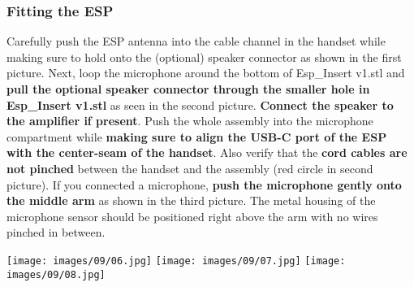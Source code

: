 \documentclass[]{article}
\begin{document}
\subsubsection{Fitting the ESP}
\begin{minipage}[t]{0.4\linewidth}
	\vspace{0pt}
	Carefully push the ESP antenna into the cable channel in the handset while making sure to hold onto the (optional) speaker connector as shown in the first picture.
	\newline
	\newline
	Next, loop the microphone around the bottom of Esp\_Insert v1.stl and \textbf{pull the optional speaker connector through the smaller hole in Esp\_Insert v1.stl} as seen in the second picture.
	\newline
	\newline
	\textbf{Connect the speaker to the amplifier if present}.
	\newline
	\newline
	Push the whole assembly into the microphone compartment while \textbf{making sure to align the USB-C port of the ESP with the center-seam of the handset}. Also verify that the \textbf{cord cables are not pinched} between the handset and the assembly (red circle in second picture).
	\newline
	\newline
	If you connected a microphone, \textbf{push the microphone gently onto the middle arm} as shown in the third picture. The metal housing of the microphone sensor should be positioned right above the arm with no wires pinched in between.
\end{minipage}
\hfill
\begin{minipage}[t]{0.45\linewidth}
	\vspace{0pt}
	\texttt{[image: images/09/06.jpg]}
	\texttt{[image: images/09/07.jpg]}
	\texttt{[image: images/09/08.jpg]}
\end{minipage}
\end{document}
